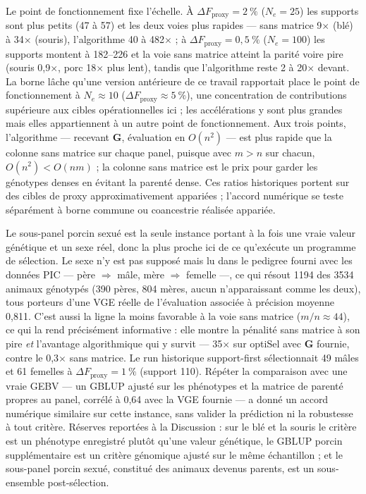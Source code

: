 \documentclass[11pt]{article}
\newcommand{\bG}{\mathbf{G}}
\begin{document}
Le point de fonctionnement fixe l'échelle. À $\Delta F_{\mathrm{proxy}}=2~\%$ ($N_e=25$) les supports sont plus petits (47 à 57) et les deux voies plus rapides --- sans matrice 9$\times$ (blé) à 34$\times$ (souris), l'algorithme 40 à 482$\times$ ; à $\Delta F_{\mathrm{proxy}}=0,5~\%$ ($N_e=100$) les supports montent à 182--226 et la voie sans matrice atteint la parité voire pire (souris 0,9$\times$, porc 18$\times$ plus lent), tandis que l'algorithme reste 2 à 20$\times$ devant. La borne lâche qu'une version antérieure de ce travail rapportait place le point de fonctionnement à $N_e\approx10$ ($\Delta F_{\mathrm{proxy}}\approx5~\%$), une concentration de contributions supérieure aux cibles opérationnelles ici ; les accélérations y sont plus grandes mais elles appartiennent à un autre point de fonctionnement. Aux trois points, l'algorithme --- recevant $\bG$, évaluation en $O(n^2)$ --- est plus rapide que la colonne sans matrice sur chaque panel, puisque avec $m>n$ sur chacun, $O(n^2)<O(nm)$ ; la colonne sans matrice est le prix pour garder les génotypes denses en évitant la parenté dense. Ces ratios historiques portent sur des cibles de proxy approximativement appariées ; l'accord numérique se teste séparément à borne commune ou coancestrie réalisée appariée.

Le sous-panel porcin sexué est la seule instance portant à la fois une vraie valeur génétique et un sexe réel, donc la plus proche ici de ce qu'exécute un programme de sélection. Le sexe n'y est pas supposé mais lu dans le pedigree fourni avec les données PIC --- père $\Rightarrow$ mâle, mère $\Rightarrow$ femelle ---, ce qui résout 1194 des 3534 animaux génotypés (390 pères, 804 mères, aucun n'apparaissant comme les deux), tous porteurs d'une VGE réelle de l'évaluation associée à précision moyenne 0,811. C'est aussi la ligne la moins favorable à la voie sans matrice ($m/n\approx44$), ce qui la rend précisément informative : elle montre la pénalité sans matrice à son pire \emph{et} l'avantage algorithmique qui y survit --- 35$\times$ sur optiSel avec $\bG$ fournie, contre le 0,3$\times$ sans matrice. Le run historique support-first sélectionnait 49 mâles et 61 femelles à $\Delta F_{\mathrm{proxy}}=1~\%$ (support 110). Répéter la comparaison avec une vraie GEBV --- un GBLUP ajusté sur les phénotypes et la matrice de parenté propres au panel, corrélé à 0,64 avec la VGE fournie --- a donné un accord numérique similaire sur cette instance, sans valider la prédiction ni la robustesse à tout critère. Réserves reportées à la Discussion : sur le blé et la souris le critère est un phénotype enregistré plutôt qu'une valeur génétique, le GBLUP porcin supplémentaire est un critère génomique ajusté sur le même échantillon ; et le sous-panel porcin sexué, constitué des animaux devenus parents, est un sous-ensemble post-sélection.
\end{document}
